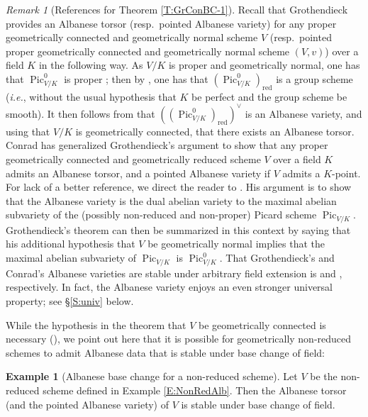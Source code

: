 \documentclass[11pt, reqno]{amsart}
\numberwithin{equation}{section}
\theoremstyle{definition}
\newtheorem{exa}[teo]{Example}
\theoremstyle{remark}
\newtheorem{rem}[teo]{Remark}
\begin{document}
 \begin{rem}[References for Theorem \ref{T:GrConBC-1}]\label{R:GrCon}
  Recall that Grothendieck provides an Albanese torsor (resp.~pointed Albanese variety) for any proper geometrically connected and 
  geometrically normal  scheme $V$ (resp.~pointed  proper geometrically connected and 
  geometrically normal  scheme $(V,v)$) over a field $K$ in the following way.
  As $V/K$ is proper and geometrically normal, one has that
  $\operatorname{Pic}^0_{V/K}$ is proper \cite[Thm.~VI.2.1(ii)]{FGA}; then by
  \cite[Prop.~VI.2.1]{FGA}, one has that $(\operatorname{Pic}^0_{V/K})_{\operatorname{red}}$ is a
  group scheme (\emph{i.e.}, without the usual hypothesis that $K$ be perfect and the group scheme be smooth).
  It then follows from \cite[Thm.~VI.3.3(iii)]{FGA} that
  $((\operatorname{Pic}^0_{V/K})_{\operatorname{red}})^\vee$
   is an Albanese variety, and using that $V/K$ is geometrically connected,  that there exists an Albanese torsor.
  Conrad has generalized Grothendieck's argument to show that any proper geometrically connected and  
  geometrically reduced  
   scheme $V$ over a field $K$ admits an
  Albanese torsor,  and  a pointed Albanese variety if $V$ admits a $K$-point. For lack of a better reference, we direct the reader to
  \cite[Thm.]{ConradMathOver}.
  His argument is to show that the Albanese variety is the dual abelian variety to the
  maximal abelian subvariety of the (possibly non-reduced and non-proper) Picard
  scheme  $\operatorname{Pic}_{V/K}$.  Grothendieck's theorem can then be
  summarized in this context by saying that his additional hypothesis that $V$ be
  geometrically normal implies that the maximal abelian subvariety of
  $\operatorname{Pic}_{V/K}$ is $\operatorname{Pic}^0_{V/K}$.
That Grothendieck's and Conrad's Albanese varieties are stable under arbitrary field
  extension 
  is  \cite[Thm.~VI.3.3(iii)]{FGA} and \cite[Prop.]{ConradMathOver},
  respectively.  In fact, the Albanese variety enjoys an even
                stronger universal property; see \S \ref{S:univ} below.
 \end{rem}
 
 
  While the hypothesis in the theorem that $V$ be geometrically connected is necessary (), we point out here that it is possible for geometrically non-reduced schemes to admit Albanese data that is stable under base change of field:
  
  
  \begin{exa}[Albanese base change for a non-reduced scheme]
\label{E:NonRedAlbBC}  Let $V$ be the non-reduced scheme defined in Example \ref{E:NonRedAlb}.  Then the Albanese torsor (and the pointed Albanese variety) of $V$ is stable under base change of field.
\end{exa}
\end{document}
